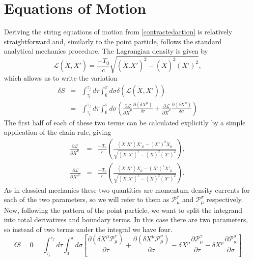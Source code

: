 \documentclass[a4paper,12pt]{article}
\numberwithin{equation}{section}
\begin{document}
\section{Equations of Motion}\label{sectioneom}
Deriving the string equations of motion from \ref{contractedaction} is relatively straightforward and, similarly to the point particle, follows the standard analytical mechanics procedure. The Lagrangian density is given by 
\begin{equation}
\mathcal{L}(\dot{X}, X') = \frac{-T_0}{c} \sqrt{(\dot{X}.X')^2 - (\dot{X})^2(X')^2},
\end{equation}
which allows us to write the variation 
\begin{eqnarray*}
\delta S & = & \int_{\tau_i}^{\tau_f} d\tau \int_0^\pi d\sigma \delta\left(\mathcal{L}(\dot{X}, X')\right) \\
& = & \int_{\tau_i}^{\tau_f} d\tau \int_0^\pi d\sigma\left( \frac{\partial \mathcal{L}}{\partial \dot{X}^\mu}\frac{\partial (\delta X^\mu)}{\delta \tau} + \frac{\partial \mathcal{L}}{\partial \dot{X}^\mu}\frac{\partial (\delta X^\mu)}{\delta \sigma} \right)
\end{eqnarray*}
The first half of each of these two terms can be calculated explicitly by a simple application of the chain rule, giving
\begin{eqnarray}
\frac{\partial \mathcal{L}}{\partial \dot{X}^\mu} & = & \frac{-T_0}{c}\left( \frac{(\dot{X}.X')X'_\mu - (X')^2\dot{X}_\mu}{\sqrt{(\dot{X}.X')^2 - (\dot{X})^2(X')^2}}\right)\label{taumomentum}, \\
\frac{\partial \mathcal{L}}{\partial X'^\mu} & = & \frac{-T_0}{c}\left( \frac{(\dot{X}.X')\dot{X}_\mu - (X')^2X'_\mu}{\sqrt{(\dot{X}.X')^2 - (\dot{X})^2(X')^2}}\right)\label{sigmamomentum} .
\end{eqnarray}
As in classical mechanics these two quantities are momentum density currents for each of the two parameters, so we will refer to them as $\mathcal{P}^\tau_\mu$ and $\mathcal{P}^\sigma_\mu$ respectively. Now, following the pattern of the point particle, we want to split the integrand into total derivatives and boundary terms. In this case there are two parameters, so instead of two terms under the integral we have four.
\begin{equation}\label{variint}
\delta S = 0 = \int_{\tau_i}^{\tau_f} d\tau \int_0^\pi d\sigma \left[\frac{\partial(\delta X^\mu \mathcal{P_\mu^\tau})}{\partial \tau} + \frac{\partial (\delta X^\mu \mathcal{P}^\sigma_\mu)}{\partial \sigma}  - \delta X^\mu\frac{\partial \mathcal{P}_\mu^\tau}{\partial \tau} - \delta X^\mu\frac{\partial \mathcal{P}_\mu^\sigma}{\partial \sigma}\right]
\end{equation}
\end{document}
